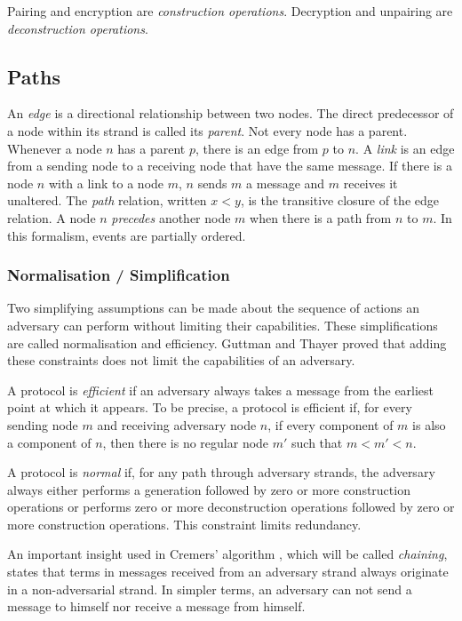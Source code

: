 			Pairing and encryption are \emph{construction operations}.
			Decryption and unpairing are \emph{deconstruction operations}.

		\subsection{Paths}

			An \emph{edge} is a directional relationship between two nodes.
			The direct predecessor of a node within its strand is called its
			\emph{parent}. Not every node has a parent. Whenever a node $n$ has
			a parent $p$, there is an edge from $p$ to $n$. A \emph{link} is an
			edge from a sending node to a receiving node that have the same
			message. If there is a node $n$ with a link to a node $m$, $n$
			sends $m$ a message and $m$ receives it unaltered. The \emph{path}
			relation, written $x < y$, is the transitive closure of the edge
			relation. A node $n$ \emph{precedes} another node $m$ when there is
			a path from $n$ to $m$. In this formalism, events are partially
			ordered.

		\subsubsection{Normalisation / Simplification}

			Two simplifying assumptions can be made about the sequence of
			actions an adversary can perform without limiting their
			capabilities. These simplifications are called normalisation and
			efficiency. Guttman and Thayer \cite{GJF02} proved that adding
			these constraints does not limit the capabilities of an adversary.

			A protocol is \emph{efficient} if an adversary always takes a
			message from the earliest point at which it appears. To be precise,
			a protocol is efficient if, for every sending node $m$ and
			receiving adversary node $n$, if every component of $m$ is also a
			component of $n$, then there is no regular node $m'$ such that $m <
			m' < n$.

			A protocol is \emph{normal} if, for any path through adversary
			strands, the adversary always either performs a generation followed
			by zero or more construction operations or performs zero or more
			deconstruction operations followed by zero or more construction
			operations. This constraint limits redundancy.

			An important insight used in Cremers' algorithm \cite{Cremers08},
			which will be called \emph{chaining}, states that terms in messages
			received from an adversary strand always originate in a
			non-adversarial strand. In simpler terms, an adversary can not send
			a message to himself nor receive a message from himself.

